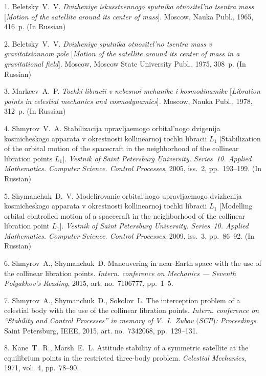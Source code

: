 

{\footnotesize

\vskip 3mm


\vskip 2mm

1. Beletsky~V.~V. \textit{Dvizheniye iskusstvennogo sputnika
otnositel'no tsentra mass} [\textit{Motion of the satellite around
its center of mass}]. Moscow, Nauka Publ., 1965, 416~p. (In
Russian)

2.  Beletsky~V.~V. \textit{Dvizheniye sputnika otnositel'no
tsentra mass v gravitatsionnom pole} [\textit{Motion of the
satellite around its center of mass in a gravitational field}].
Moscow, Moscow State University Publ., 1975, 308~p. (In Russian)

3. Markeev~A.~P. \textit{Tochki libracii v nebesnoi mehanike i
kosmodinamike} [\textit{Libration points in celestial mechanics
and cosmodynamics}]. Moscow, Nauka Publ., 1978, 312~p. (In
Russian)

4. Shmyrov~V.~A. Stabilizacija upravljaemogo orbital'nogo
dvigenija kosmicheskogo apparata v okrestnosti kollinearnoj tochki
libracii $L_1$ [Stabilization of the orbital motion of the
spacecraft in the neighborhood of the collinear libration points
$L_1$]. \textit{Vestnik of Saint Petersburg University. Series~10.
Applied Mathematics. Computer Science. Control Processes}, 2005,
iss.~2, pp.~193--199. (In Russian)

5. Shymanchuk~D.~V. Modelirovanie orbital'nogo upravljaemogo
dvizhenija kosmicheskogo apparata v okrestnosti kollinearnoj
tochki libracii $L_1$ [Modelling orbital controlled motion of a
spacecraft in the neighborhood of the collinear libration point
$L_1$]. \textit{Vestnik of Saint Petersburg University. Series~10.
Applied Mathematics. Computer Science. Control Processes}, 2009,
iss.~3, pp.~86--92. (In Russian)

6. Shmyrov~A., Shymanchuk~D. Maneuvering in near-Earth space with
the use of the collinear libration points. \textit{Intern.
conference on Mechanics --- Seventh Polyakhov's Reading}, 2015,
art. no.~7106777, pp.~1--5.

7. Shmyrov~A., Shymanchuk~D., Sokolov~L. The interception problem
of a celestial body with the use of the collinear libration
points. \textit{Intern. conference on ``Stability and Control
Processes'' in memory of V.~I.~Zubov $($SCP$)$: Proceedings}.
Saint Petersburg, IEEE, 2015, art. no.~7342068, pp.~129--131.

8. Kane~T.~R., Marsh~E.~L. Attitude stability of a symmetric
satellite at the equilibrium points in the restricted three-body
problem. \textit{Celestial Mechanics}, 1971, vol.~4, pp.~78--90.

}
